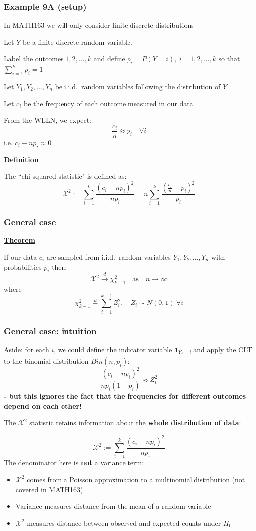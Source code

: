 \documentclass[t,8pt]{beamer}
\begin{document}
\begin{frame}
	\frametitle{Example 9A (setup)}
	In MATH163 we will only consider finite discrete distributions \par
	Let $Y$ be a finite discrete random variable. \par
	Label the outcomes $1,2,\dots,k$ and define $p_i=P(Y=i),\ i=1,2,\dots,k$ so that $\sum_{i=1}^kp_i=1$ \par
	Let $Y_1,Y_2,\dots,Y_n$ be i.i.d.\ random variables following the distribution of $Y$ \par
	Let $c_i$ be the frequency of each outcome measured in our data \par
	From the WLLN, we expect:
	$$\frac {c_i}n\approx p_i\quad\forall i$$
	i.e. $c_i-np_i\approx 0$ \par
	{\bf\underline{Definition}} \par
	The ``chi-squared statistic" is defined as:
	$$\mathcal{X}^2:=\sum_{i=1}^k\frac{(c_i-np_i)^2}{np_i}
	=n\sum_{i=1}^k\frac{\left(\frac{c_i}n-p_i\right)^2}{p_i}$$
\end{frame}

\begin{frame}
	\frametitle{General case}
	{\bf\underline{Theorem}} \par
	If our data $c_i$ are sampled from i.i.d.\ random variables $Y_1,Y_2,\dots,Y_n$ with probabilities $p_i$ then:
	\[
	\mathcal{X}^2\xrightarrow{d}\chi^2_{k-1}\quad\text{as}\quad n\rightarrow\infty
	\]
	where
	\[
	\chi^2_{k-1}\stackrel{d}{=}\sum_{i=1}^{k-1}Z_i^2,\quad Z_i\sim N(0,1)\ \forall i
	\]
\end{frame}

\begin{frame}
	\frametitle{General case: intuition}
	Aside: for each $i$, we could define the indicator variable $\mathbf 1_{Y_j=i}$ and apply the CLT to the binomial distribution $Bin(n,p_i)$:
	$$\frac{(c_i-np_i)^2}{np_i(1-p_i)}\approx Z_i^2$$
	{\bf - but this ignores the fact that the frequencies for different outcomes depend on each other!} \par
	The $\mathcal{X}^2$ statistic retains information about the {\bf whole distribution of data}: \par
	$$\mathcal{X}^2:=\sum_{i=1}^k\frac{(c_i-np_i)^2}{np_i}$$
	The denominator here is {\bf not} a variance term: \par
	\begin{itemize}
		\item $\mathcal{X}^2$ comes from a Poisson approximation to a multinomial distribution (not covered in MATH163)
		\item Variance measures distance from the mean of a random variable \par
		\item $\mathcal{X}^2$ measures distance between observed and expected counts under $H_0$
	\end{itemize}
\end{frame}
\end{document}
